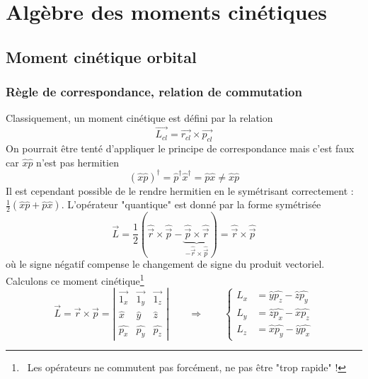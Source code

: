 \chapter{Algèbre des moments cinétiques}
\section{Moment cinétique orbital}
	\subsection{Règle de correspondance, relation de commutation}
	Classiquement, un moment cinétique est défini par la relation
	\begin{equation}
	\vec{L_{cl}} = \vec{r_{cl}}\times\vec{p_{cl}}
	\end{equation}
	On pourrait être tenté d'appliquer le principe de correspondance mais c'est faux car 
	$\hat{x}\hat{p}$ n'est pas hermitien
	\begin{equation}
	(\hat{x}\hat{p})^\dagger = \hat{p}^\dagger\hat{x}^\dagger = \hat{p}\hat{x}\neq\hat{x}\hat{p}
	\end{equation}		
	Il est cependant possible de le rendre hermitien	en le symétrisant correctement : $\frac{1}{2}(\hat{x}\hat{p}
	+\hat{p}\hat{x})$. L'opérateur "quantique" est donné par la forme symétrisée 
	\begin{equation}
	\vec{L} = \frac{1}{2}\left(\hat{\vec{r}}\times\hat{\vec{p}}-\underbrace{\hat{\vec{p}}\times
	\hat{\vec{r}}}_{-\hat{\vec{r}}\times\hat{\vec{p}}}\right) = \hat{\vec{r}}\times\hat{\vec{p}}
	\end{equation}
	où le signe négatif compense le changement de signe du produit vectoriel. Calculons ce moment 
	cinétique\footnote{\danger\ Les opérateurs ne commutent pas forcément, ne pas être "trop rapide" !}
	\begin{equation}
	\vec{L}=\vec{r}\times\vec{p} = \left|\begin{array}{ccc}
	\vec{1_x} & \vec{1_y} & \vec{1_z}\\
	\hat{x} & \hat{y} & \hat{z}\\
	\hat{p_x} & \hat{p_y} & \hat{p_z}
	\end{array}\right|\qquad\Longrightarrow\qquad\left\{\begin{array}{ll}
	L_x &= \hat{y}\hat{p_z} - \hat{z}\hat{p_y}\\
	L_y &= \hat{z}\hat{p_x}-\hat{x}\hat{p_z}\\
	L_z &= \hat{x}\hat{p_y}-\hat{y}\hat{p_x}
	\end{array}\right.
	\end{equation}
